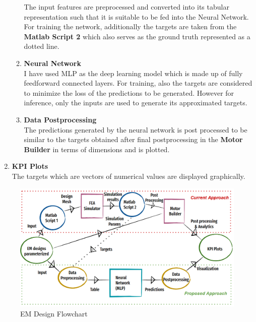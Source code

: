 \documentclass{report} %
\begin{document}
\begin{enumerate}
\begin{enumerate}
        The input features are preprocessed and converted into its tabular representation such that it is suitable to be fed into the Neural Network.
        For training the network, additionally the targets are taken from the \textbf{Matlab Script 2} which also serves as the ground truth represented as a dotted line.
        \item \textbf{Neural Network} \\
        I have used \ac{MLP} as the deep learning model which is made up of fully feedforward connected layers. For training, also the targets are considered to minimize 
        the loss of the predictions to be generated. However for inference, only the inputs are used to generate its approximated targets.
        \item \textbf{Data Postprocessing} \\
        The predictions generated by the neural network is post processed to be similar to the targets obtained after final postprocessing in the 
        \textbf{Motor Builder} in terms of dimensions and is plotted.
    \end{enumerate}    
    \item \textbf{KPI Plots} \\
    The targets which are vectors of numerical values are displayed graphically.
\end{enumerate}

\begin{figure}[H]
    \centering
    \includegraphics[width=1\textwidth]{./ReportImages/EM_design_flowchart_v2.png} 
    \caption{\ac{EM} Design Flowchart}
    \label{fig:EM Design Flowchart}
\end{figure}
\end{document}

